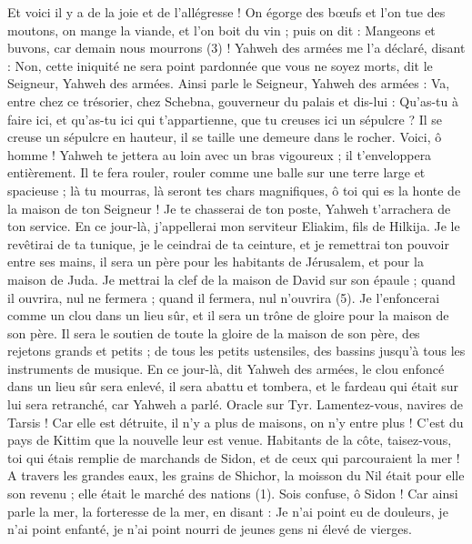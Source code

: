 \begin{multicols}{2}
Et voici il y a de la joie et de l'allégresse ! On égorge des bœufs et l’on tue des moutons, on mange la viande, et l’on boit du vin ; puis on dit : Mangeons et buvons, car demain nous mourrons (3) !
Yahweh des armées me l’a déclaré, disant : Non, cette iniquité ne sera point pardonnée que vous ne soyez morts, dit le Seigneur, Yahweh des armées.
Ainsi parle le Seigneur, Yahweh des armées : Va, entre chez ce trésorier, chez Schebna, gouverneur du palais et dis-lui :
Qu'as-tu à faire ici, et qu’as-tu ici qui t'appartienne, que tu creuses ici un sépulcre ? Il se creuse un sépulcre en hauteur, il se taille une demeure dans le rocher.
Voici, ô homme ! Yahweh te jettera au loin avec un bras vigoureux ; il t’enveloppera entièrement.
Il te fera rouler, rouler comme une balle sur une terre large et spacieuse ; là tu mourras, là seront tes chars magnifiques, ô toi qui es la honte de la maison de ton Seigneur !
Je te chasserai de ton poste, Yahweh t’arrachera de ton service.
En ce jour-là, j'appellerai mon serviteur Eliakim, fils de Hilkija.
Je le revêtirai de ta tunique, je le ceindrai de ta ceinture, et je remettrai ton pouvoir entre ses mains, il sera un père pour les habitants de Jérusalem, et pour la maison de Juda.
Je mettrai la clef de la maison de David sur son épaule ; quand il ouvrira, nul ne fermera ; quand il fermera, nul n’ouvrira (5).
Je l’enfoncerai comme un clou dans un lieu sûr, et il sera un trône de gloire pour la maison de son père.
Il sera le soutien de toute la gloire de la maison de son père, des rejetons grands et petits ; de tous les petits ustensiles, des bassins jusqu’à tous les instruments de musique.
En ce jour-là, dit Yahweh des armées, le clou enfoncé dans un lieu sûr sera enlevé, il sera abattu et tombera, et le fardeau qui était sur lui sera retranché, car Yahweh a parlé.
\VerseOne{}Oracle sur Tyr. Lamentez-vous, navires de Tarsis ! Car elle est détruite, il n'y a plus de maisons, on n'y entre plus ! C’est du pays de Kittim que la nouvelle leur est venue.
Habitants de la côte, taisez-vous, toi qui étais remplie de marchands de Sidon, et de ceux qui parcouraient la mer !
A travers les grandes eaux, les grains de Shichor, la moisson du Nil était pour elle son revenu ; elle était le marché des nations (1).
Sois confuse, ô Sidon ! Car ainsi parle la mer, la forteresse de la mer, en disant : Je n'ai point eu de douleurs, je n'ai point enfanté, je n'ai point nourri de jeunes gens ni élevé de vierges.

\end{multicols}
